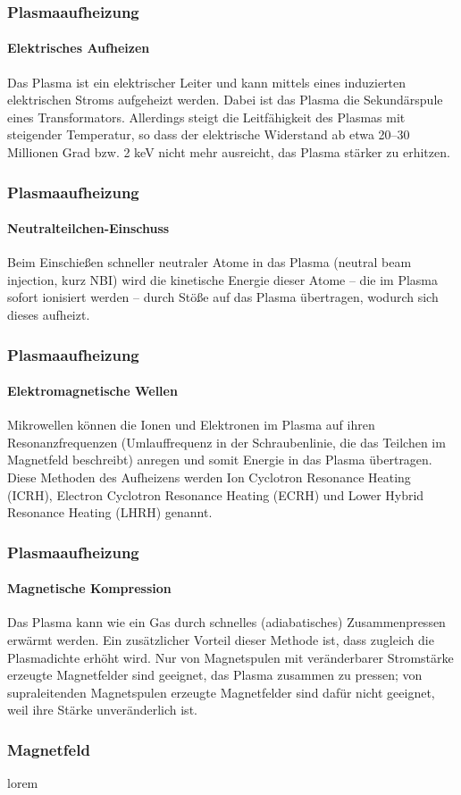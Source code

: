 \documentclass[aspectratio=169]{beamer}
\begin{document}
    \begin{frame}
      \frametitle{Plasmaaufheizung}
      \framesubtitle{Elektrisches Aufheizen}
      Das Plasma ist ein elektrischer Leiter und kann mittels eines induzierten elektrischen Stroms aufgeheizt werden. Dabei ist das Plasma die Sekundärspule eines Transformators. Allerdings steigt die Leitfähigkeit des Plasmas mit steigender Temperatur, so dass der elektrische Widerstand ab etwa 20–30 Millionen Grad bzw. 2 keV nicht mehr ausreicht, das Plasma stärker zu erhitzen.
    \end{frame}

    \begin{frame}
      \frametitle{Plasmaaufheizung}
      \framesubtitle{Neutralteilchen-Einschuss}
      Beim Einschießen schneller neutraler Atome in das Plasma (neutral beam injection, kurz NBI) wird die kinetische Energie dieser Atome – die im Plasma sofort ionisiert werden – durch Stöße auf das Plasma übertragen, wodurch sich dieses aufheizt.
    \end{frame}

    \begin{frame}
      \frametitle{Plasmaaufheizung}
      \framesubtitle{Elektromagnetische Wellen}
      Mikrowellen können die Ionen und Elektronen im Plasma auf ihren Resonanzfrequenzen (Umlauffrequenz in der Schraubenlinie, die das Teilchen im Magnetfeld beschreibt) anregen und somit Energie in das Plasma übertragen. Diese Methoden des Aufheizens werden Ion Cyclotron Resonance Heating (ICRH), Electron Cyclotron Resonance Heating (ECRH) und Lower Hybrid Resonance Heating (LHRH) genannt.
    \end{frame}

    \begin{frame}
      \frametitle{Plasmaaufheizung}
      \framesubtitle{Magnetische Kompression}
      Das Plasma kann wie ein Gas durch schnelles (adiabatisches) Zusammenpressen erwärmt werden. Ein zusätzlicher Vorteil dieser Methode ist, dass zugleich die Plasmadichte erhöht wird. Nur von Magnetspulen mit veränderbarer Stromstärke erzeugte Magnetfelder sind geeignet, das Plasma zusammen zu pressen; von supraleitenden Magnetspulen erzeugte Magnetfelder sind dafür nicht geeignet, weil ihre Stärke unveränderlich ist.
    \end{frame}

    \begin{frame}
      \frametitle{Magnetfeld}
      lorem
    \end{frame}
\end{document}
